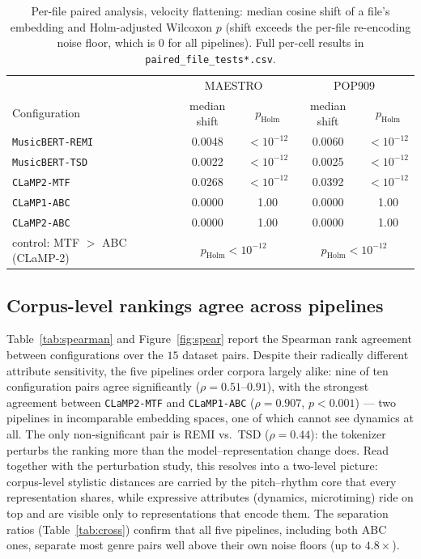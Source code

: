 \documentclass[11pt]{article}
\begin{document}
\begin{table}[t]
\centering
\caption{Per-file paired analysis, velocity flattening: median cosine
shift of a file's embedding and Holm-adjusted Wilcoxon $p$ (shift exceeds
the per-file re-encoding noise floor, which is $0$ for all pipelines).
Full per-cell results in \texttt{paired\_file\_tests*.csv}.}
\label{tab:paired}
\small
\begin{tabular}{@{}lcccc@{}}
\toprule
 & \multicolumn{2}{c}{MAESTRO} & \multicolumn{2}{c}{POP909} \\
Configuration & median shift & $p_{\mathrm{Holm}}$ & median shift & $p_{\mathrm{Holm}}$ \\
\midrule
\texttt{MusicBERT-REMI} & 0.0048 & $<10^{-12}$ & 0.0060 & $<10^{-12}$ \\
\texttt{MusicBERT-TSD}  & 0.0022 & $<10^{-12}$ & 0.0025 & $<10^{-12}$ \\
\texttt{CLaMP2-MTF}     & 0.0268 & $<10^{-12}$ & 0.0392 & $<10^{-12}$ \\
\texttt{CLaMP1-ABC}     & 0.0000 & 1.00 & 0.0000 & 1.00 \\
\texttt{CLaMP2-ABC}     & 0.0000 & 1.00 & 0.0000 & 1.00 \\
\addlinespace
control: MTF $>$ ABC (CLaMP-2) & \multicolumn{2}{c}{$p_{\mathrm{Holm}}<10^{-12}$} & \multicolumn{2}{c}{$p_{\mathrm{Holm}}<10^{-12}$} \\
\bottomrule
\end{tabular}
\end{table}

\subsection{Corpus-level rankings agree across pipelines}
Table~\ref{tab:spearman} and Figure~\ref{fig:spear} report the Spearman
rank agreement between configurations over the $15$ dataset pairs. Despite
their radically different attribute sensitivity, the five pipelines order
corpora largely alike: nine of ten configuration pairs agree significantly
($\rho=0.51$--$0.91$), with the strongest agreement between
\texttt{CLaMP2-MTF} and \texttt{CLaMP1-ABC} ($\rho=0.907$, $p<0.001$) ---
two pipelines in incomparable embedding spaces, one of which cannot see
dynamics at all. The only non-significant pair is REMI vs.\ TSD
($\rho=0.44$): the tokenizer perturbs the ranking more than the
model--representation change does. Read together with the perturbation
study, this resolves into a two-level picture: corpus-level stylistic
distances are carried by the pitch--rhythm core that every representation
shares, while expressive attributes (dynamics, microtiming) ride on top
and are visible only to representations that encode them. The separation
ratios (Table~\ref{tab:cross}) confirm that all five pipelines, including
both ABC ones, separate most genre pairs well above their own noise floors
(up to $4.8\times$).
\end{document}
